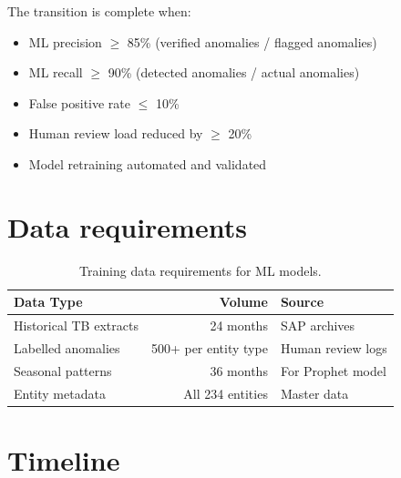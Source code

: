 The transition is complete when:
\begin{itemize}
  \item ML precision $\geq$ 85\% (verified anomalies / flagged anomalies)
  \item ML recall $\geq$ 90\% (detected anomalies / actual anomalies)
  \item False positive rate $\leq$ 10\%
  \item Human review load reduced by $\geq$ 20\%
  \item Model retraining automated and validated
\end{itemize}

\section{Data requirements}

\begin{table}[htbp]
\centering
\caption{Training data requirements for ML models.}
\footnotesize
\begin{tabularx}{\linewidth}{@{}l r X@{}}
\toprule
\textbf{Data Type} & \textbf{Volume} & \textbf{Source} \\ \midrule
Historical TB extracts & 24 months & SAP archives \\
Labelled anomalies & 500+ per entity type & Human review logs \\
Seasonal patterns & 36 months & For Prophet model \\
Entity metadata & All 234 entities & Master data \\
\bottomrule
\end{tabularx}
\end{table}

\section{Timeline}

